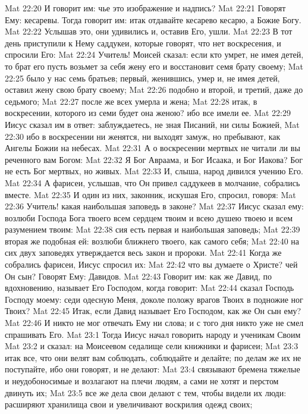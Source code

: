 Mat 22:20  И говорит им: чье это изображение и надпись?
Mat 22:21  Говорят Ему: кесаревы. Тогда говорит им: итак отдавайте кесарево кесарю, а Божие Богу.
Mat 22:22  Услышав это, они удивились и, оставив Его, ушли.
Mat 22:23  В тот день приступили к Нему саддукеи, которые говорят, что нет воскресения, и спросили Его:
Mat 22:24  Учитель! Моисей сказал: если кто умрет, не имея детей, то брат его пусть возьмет за себя жену его и восстановит семя брату своему;
Mat 22:25  было у нас семь братьев; первый, женившись, умер и, не имея детей, оставил жену свою брату своему;
Mat 22:26  подобно и второй, и третий, даже до седьмого;
Mat 22:27  после же всех умерла и жена;
Mat 22:28  итак, в воскресении, которого из семи будет она женою? ибо все имели ее.
Mat 22:29  Иисус сказал им в ответ: заблуждаетесь, не зная Писаний, ни силы Божией,
Mat 22:30  ибо в воскресении ни женятся, ни выходят замуж, но пребывают, как Ангелы Божии на небесах.
Mat 22:31  А о воскресении мертвых не читали ли вы реченного вам Богом:
Mat 22:32  Я Бог Авраама, и Бог Исаака, и Бог Иакова? Бог не есть Бог мертвых, но живых.
Mat 22:33  И, слыша, народ дивился учению Его.
Mat 22:34  А фарисеи, услышав, что Он привел саддукеев в молчание, собрались вместе.
Mat 22:35  И один из них, законник, искушая Его, спросил, говоря:
Mat 22:36  Учитель! какая наибольшая заповедь в законе?
Mat 22:37  Иисус сказал ему: возлюби Господа Бога твоего всем сердцем твоим и всею душею твоею и всем разумением твоим:
Mat 22:38  сия есть первая и наибольшая заповедь;
Mat 22:39  вторая же подобная ей: возлюби ближнего твоего, как самого себя;
Mat 22:40  на сих двух заповедях утверждается весь закон и пророки.
Mat 22:41  Когда же собрались фарисеи, Иисус спросил их:
Mat 22:42  что вы думаете о Христе? чей Он сын? Говорят Ему: Давидов.
Mat 22:43  Говорит им: как же Давид, по вдохновению, называет Его Господом, когда говорит:
Mat 22:44  сказал Господь Господу моему: седи одесную Меня, доколе положу врагов Твоих в подножие ног Твоих?
Mat 22:45  Итак, если Давид называет Его Господом, как же Он сын ему?
Mat 22:46  И никто не мог отвечать Ему ни слова; и с того дня никто уже не смел спрашивать Его.
Mat 23:1  Тогда Иисус начал говорить народу и ученикам Своим
Mat 23:2  и сказал: на Моисеевом седалище сели книжники и фарисеи;
Mat 23:3  итак все, что они велят вам соблюдать, соблюдайте и делайте; по делам же их не поступайте, ибо они говорят, и не делают:
Mat 23:4  связывают бремена тяжелые и неудобоносимые и возлагают на плечи людям, а сами не хотят и перстом двинуть их;
Mat 23:5  все же дела свои делают с тем, чтобы видели их люди: расширяют хранилища свои и увеличивают воскрилия одежд своих;
